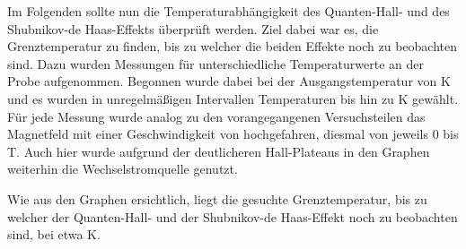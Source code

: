 
Im Folgenden sollte nun die Temperaturabhängigkeit des Quanten-Hall- und des Shubnikov-de Haas-Effekts überprüft werden. Ziel dabei war es, die Grenztemperatur zu finden, bis zu welcher die beiden Effekte noch zu beobachten sind. 
Dazu wurden Messungen für unterschiedliche Temperaturwerte an der Probe aufgenommen. Begonnen wurde dabei bei der Ausgangstemperatur von \unit[2]{K} und es wurden in unregelmäßigen Intervallen Temperaturen bis hin zu \unit[40]{K} gewählt. Für jede Messung wurde analog zu den vorangegangenen Versuchsteilen das Magnetfeld mit einer Geschwindigkeit von  hochgefahren, diesmal von jeweils 0 bis \unit[7]{T}. Auch hier wurde aufgrund der deutlicheren Hall-Plateaus in den Graphen weiterhin die Wechselstromquelle genutzt. 

Wie aus den Graphen %
ersichtlich, liegt die gesuchte Grenztemperatur, bis zu welcher der Quanten-Hall- und der Shubnikov-de Haas-Effekt noch zu beobachten sind, bei etwa \unit[15]{K}. %





